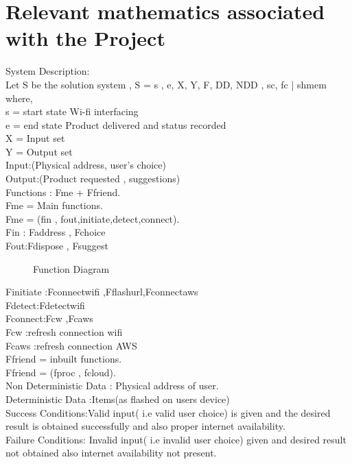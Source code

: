 \documentclass[oneside,a4paper,12pt]{report}
\begin{document}
\section{Relevant mathematics associated with the Project}
\label{sec:math}
System Description:\\
 Let S be the solution system ,
	  S = {s , e, X, Y, F, DD, NDD , sc, fc | shmem}\\
            where,    \\   
s = start state {Wi-fi interfacing}\\
e = end state { Product delivered and status recorded}\\
X = Input set\\
Y = Output set\\
Input:(Physical address, user’s choice)	\\ 
Output:(Product requested , suggestions)\\ 
Functions : Fme + Ffriend.\\
Fme = Main functions.\\
Fme = (fin , fout,initiate,detect,connect).\\
Fin : {Faddress , Fchoice}\\
Fout:{Fdispose , Fsuggest}\\
\begin{center}
	\begin{figure}[!htbp]
		\centering
	  \caption{Function Diagram}
	  \label{fig:act-dig}
	\end{figure}
\end{center}  
Finitiate :{Fconnectwifi ,Fflashurl,Fconnectaws}\\
Fdetect:{Fdetectwifi}\\
Fconnect:{Fcw ,Fcaws}\\
Fcw :refresh connection wifi\\
Fcaws :refresh connection AWS\\
Ffriend = inbuilt functions.\\
Ffriend = (fproc , fcloud).\\
Non Deterministic Data : Physical address of user.\\
Deterministic Data :Items(as flashed on users device)\\
Success Conditions:Valid input( i.e valid user choice) is given and the desired result is obtained successfully and also proper internet availability.\\
Failure Conditions: Invalid input( i.e invalid user choice)  given and desired result not obtained also internet availability not present.\\
\end{document}
